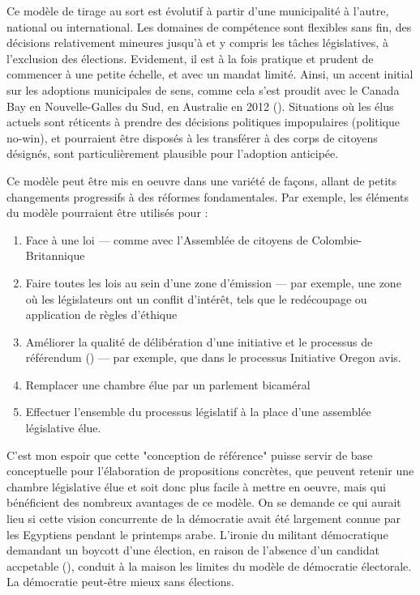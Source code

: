 Ce modèle de tirage au sort est évolutif à partir d'une municipalité à
l'autre, national ou international. Les domaines de compétence sont
flexibles sans fin, des décisions relativement mineures jusqu'à et y
compris les tâches législatives, à l'exclusion des
élections. Evidement, il est à la fois pratique et prudent de
commencer à une petite échelle, et avec un mandat limité. Ainsi, un
accent initial sur les adoptions municipales de sens, comme cela s'est
proudit avec le Canada Bay en Nouvelle-Galles du Sud, en Australie en
2012 (\cite{thompson12}). Situations où les élus actuels sont
réticents à prendre des décisions politiques 
impopulaires (politique no-win), et pourraient être disposés à les
transférer à des corps de citoyens désignés, sont particulièrement
plausible pour l'adoption anticipée.   \par
Ce modèle peut être mis en oeuvre dans une variété de façons, allant
de petits changements progressifs à des réformes fondamentales. Par
exemple, les éléments du modèle pourraient être utilisés pour : 
\begin{enumerate}
\item Face à une loi --- comme avec l'Assemblée de citoyens de
  Colombie-Britannique 
\item Faire toutes les lois au sein d'une zone d'émission --- par
  exemple, une zone où les législateurs ont un conflit d'intérêt, tels
  que le redécoupage ou application de règles d'éthique  
\item Améliorer la qualité de délibération d'une initiative et le
processus de référendum (\cite{gast12}) --- par exemple, que dans le
processus Initiative Oregon avis.
\item Remplacer une chambre élue par un parlement bicaméral
\item Effectuer l'ensemble du processus législatif à la place d'une
assemblée législative élue.
\end{enumerate}
C'est mon espoir que cette "conception de référence" puisse servir de
base conceptuelle pour l'élaboration de propositions concrètes, que
peuvent retenir une chambre législative élue et soit donc plus facile
à mettre en oeuvre, mais qui bénéficient des nombreux avantages de ce
modèle. On se demande ce qui aurait lieu si cette vision concurrente
de la démocratie avait été largement connue par les Egyptiens pendant
le printemps arabe. L'ironie du militant démocratique
\cite{ziada12} demandant un boycott d'une élection, en raison de 
l'absence d'un candidat accpetable (\cite{ziada12}), conduit à la
maison les limites du modèle de démocratie électorale. La démocratie
peut-être mieux sans élections.\par

